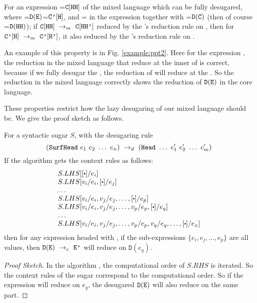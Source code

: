 \begin{property} \label{thm2}
	For an expression =$\mbox{\tt C}[\mbox{\tt HH}]$ of the mixed language which can be fully desugared, where =$\mathtt{D}(\mbox{\tt E})$=$\mbox{\tt C'}[\mbox{\tt H}]$, and = in the expression  together with =$\mathtt{D}(\mbox{\tt C})$ (then of course =$\mathtt{D}(\mbox{\tt HH})$); if $\mbox{\tt C}[\mbox{\tt HH}] ~\rightarrow_m~\mbox{\tt C}[\mbox{\tt HH'}]$ reduced by the 's reduction rule on , then for $\mbox{\tt C'}[\mbox{\tt H}] ~\rightarrow_m~\mbox{\tt C'}[\mbox{\tt H'}]$, it also reduced by the 's reduction rule on . 
\end{property}

An example of this property is in Fig. \ref{example:ppt2}. Here for the expression ,
the reduction in the mixed language that reduce at the inner  of 
is correct, because if we fully desugar the , the reduction of  will reduce at the .
So the reduction in the mixed language correctly shows the reduction of $\mathtt{D}(\mbox{\tt E})$ in the core language.

These properties restrict how the lazy desugaring of our mixed language should be. We give the proof sketch as follows.

\begin{lemma}
	For a syntactic sugar $S$, with the desugaring rule
	\[
	(\mbox{\tt SurfHead}~e_1~e_2~\ldots~e_n) ~\rightarrow_d~ (\mbox{\tt Head}~\ldots~e_1'~e_2'~\ldots~e_m')
	\]
	If the algorithm  gets the context rules as follows:
	\[
		\begin{array}{l}
			S.LHS[[\bigcdot]/e_i]\\
			S.LHS[v_i/e_i, [\bigcdot]/e_j]\\
			\ldots\\
			S.LHS[v_i/e_i, v_j/e_j, \ldots, [\bigcdot]/e_p]\\
			S.LHS[v_i/e_i, v_j/e_j, \ldots, v_p/e_p, [\bigcdot]/e_q]\\
			\ldots\\
			S.LHS[v_i/e_i, v_j/e_j, \ldots, v_p/e_p, v_q/e_q, \ldots, [\bigcdot]/e_x]\\
		\end{array}
	\]
then for any expression  headed with , if the sub-expressions $\{e_i, e_j, \ldots, e_p\}$ are all values, then $\mathtt{D}(\mbox{\tt E}) ~\rightarrow_c~\mbox{\tt E'}$ will reduce on $\mathtt{D}(e_q)$.
\end{lemma}
\begin{proof}[Proof Sketch]
In the algorithm , the computational order of $S.RHS$ is iterated. So the context rules of the sugar correspond to the computational order.
So if the expression  will reduce on $e_q$, the desugared $\mathtt{D}(\mbox{\tt E})$ will also reduce on the same part.
\end{proof}

